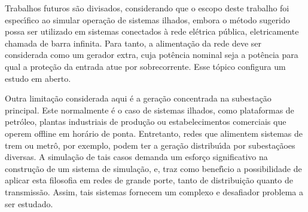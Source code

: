 Trabalhos futuros s{\~a}o divisados, considerando que o escopo deste trabalho foi espec{\'\i}fico ao simular opera{\c c}{\~a}o de sistemas ilhados, embora o m{\'e}todo sugerido possa ser utilizado em sistemas conectados {\`a} rede el{\'e}trica p{\'u}blica, eletricamente chamada de barra infinita. Para tanto, a alimenta{\c c}{\~a}o da rede deve ser considerada como um gerador extra, cuja pot{\^e}ncia nominal seja a pot{\^e}ncia para qual a prote{\c c}{\~a}o da entrada atue por sobrecorrente. Esse t{\'o}pico configura um estudo em aberto.

Outra limita{\c c}{\~a}o considerada aqui {\'e} a gera{\c c}{\~a}o concentrada na subesta{\c c}{\~a}o principal. Este normalmente {\'e} o caso de sistemas ilhados, como plataformas de petr{\'o}leo, plantas industriais de produ{\c c}{\~a}o ou estabelecimentos comerciais que operem offline em hor{\'a}rio de ponta. Entretanto, redes que alimentem sistemas de trem ou metr{\^o}, por exemplo, podem ter a gera{\c c}{\~a}o distribu{\'\i}da por subesta{\c c}{\~a}oes diversas. A simula{\c c}{\~a}o de tais casos demanda um esfor{\c c}o significativo na constru{\c c}{\~a}o de um sistema de simula{\c c}{\~a}o, e, traz como benef{\'\i}cio a possibilidade de aplicar esta filosofia em redes de grande porte, tanto de distribui{\c c}{\~a}o quanto de transmiss{\~a}o. Assim, tais sistemas fornecem um complexo e desafiador problema a ser estudado.

